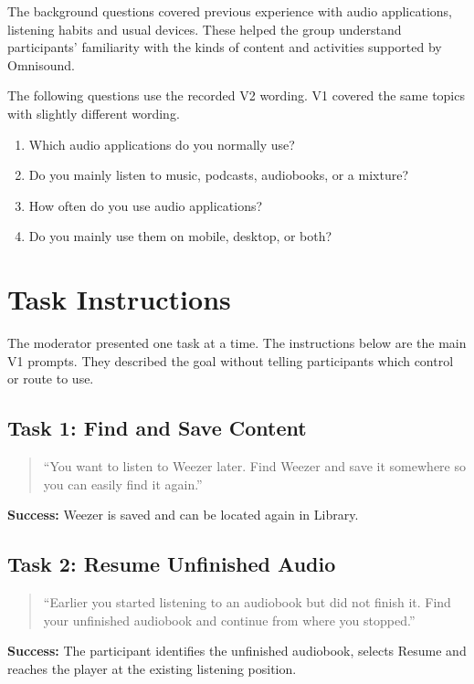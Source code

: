 The background questions covered previous experience with audio applications, listening habits and usual devices. These helped the group understand participants' familiarity with the kinds of content and activities supported by Omnisound.

The following questions use the recorded V2 wording. V1 covered the same topics with slightly different wording.

\begin{enumerate}
  \setlength{\itemsep}{2pt}
  \setlength{\parsep}{0pt}
  \item Which audio applications do you normally use?
  \item Do you mainly listen to music, podcasts, audiobooks, or a mixture?
  \item How often do you use audio applications?
  \item Do you mainly use them on mobile, desktop, or both?
\end{enumerate}

\section{Task Instructions}

The moderator presented one task at a time. The instructions below are the main V1 prompts. They described the goal without telling participants which control or route to use.

\begin{samepage}
\subsection*{Task 1: Find and Save Content}

\begin{quote}
``You want to listen to Weezer later. Find Weezer and save it somewhere so you can easily find it again.''
\end{quote}

\noindent\textbf{Success:} Weezer is saved and can be located again in Library.
\end{samepage}

\begin{samepage}
\subsection*{Task 2: Resume Unfinished Audio}

\begin{quote}
``Earlier you started listening to an audiobook but did not finish it. Find your unfinished audiobook and continue from where you stopped.''
\end{quote}

\noindent\textbf{Success:} The participant identifies the unfinished audiobook, selects Resume and reaches the player at the existing listening position.
\end{samepage}

